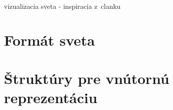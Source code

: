 vizualizacia sveta - inspiracia z~clanku \cite{Untch1990}




\section{Formát sveta}


\section{Štruktúry pre vnútornú reprezentáciu}





